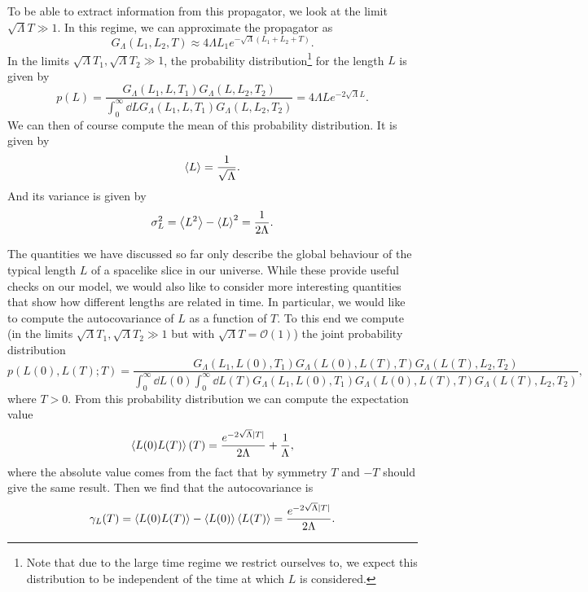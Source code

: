 To be able to extract information from this propagator, we look at the limit $\sqrt{\Lambda} T \gg 1$. In this regime, we can approximate the propagator as
\begin{equation}
    G_\Lambda(L_1, L_2, T)
    \approx
    4 \Lambda L_1 e^{-\sqrt{\Lambda} (L_1 + L_2 + T)}
    .
\end{equation}
In the limits $\sqrt{\Lambda} T_1, \sqrt{\Lambda} T_2 \gg 1$, the probability distribution\footnote{Note that due to the large time regime we restrict ourselves to, we expect this distribution to be independent of the time at which $L$ is considered.} for the length $L$ is given by
\begin{equation}
    p(L)
    =
    \frac{
        G_\Lambda(L_1, L, T_1)
        G_\Lambda(L, L_2, T_2)
    }{
        \int_0^\infty \dd{L}
        G_\Lambda(L_1, L, T_1)
        G_\Lambda(L, L_2, T_2)
    }
    =
    4 \Lambda L e^{-2 \sqrt{\Lambda} L}
    .
\end{equation}
We can then of course compute the mean of this probability distribution. It is given by
\begin{equation}\label{eq:exp_ell}
    \ev{L} = \frac{1}{\sqrt{\Lambda}}.
\end{equation}
And its variance is given by
\begin{equation}\label{eq:std_ell}
    \sigma_L^2 = \ev{L^2} - \ev{L}^2 = \frac{1}{2 \Lambda}
    .
\end{equation}

The quantities we have discussed so far only describe the global behaviour of the typical length $L$ of a spacelike slice in our universe. While these provide useful checks on our model, we would also like to consider more interesting quantities that show how different lengths are related in time. In particular, we would like to compute the autocovariance of $L$ as a function of $T$. To this end we compute (in the limits $\sqrt{\Lambda} T_1, \sqrt{\Lambda} T_2 \gg 1$ but with $\sqrt{\Lambda} T = \mathcal{O}(1)$) the joint probability distribution
\begin{equation}
    p(L(0), L(T); T)
    =
    \frac{
        G_\Lambda(L_1, L(0), T_1)
        G_\Lambda(L(0), L(T), T)
        G_\Lambda(L(T), L_2, T_2)
    }{
        \int_0^\infty \dd{L(0)} \int_0^\infty \dd{L(T)}
        G_\Lambda(L_1, L(0), T_1)
        G_\Lambda(L(0), L(T), T)
        G_\Lambda(L(T), L_2, T_2)
    }
    ,
\end{equation}
where $T > 0$. From this probability distribution we can compute the expectation value
\begin{equation}
    \ev{L(0) L(T)}(T)
    =
    \frac{e^{-2 \sqrt{\Lambda} \abs{T}}}{2 \Lambda} + \frac{1}{\Lambda}
    ,
\end{equation}
where the absolute value comes from the fact that by symmetry $T$ and $-T$ should give the same result. Then we find that the autocovariance is
\begin{equation}\label{eq:cov_ell}
    \gamma_L(T)
    =
    \ev{L(0) L(T)} - \ev{L(0)} \ev{L(T)}
    =
    \frac{e^{-2 \sqrt{\Lambda} \abs{T}}}{2 \Lambda}
    .
\end{equation}

